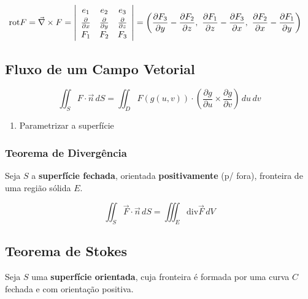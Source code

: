 \documentclass[11pt, a4paper]{article}
\begin{document}
\begin{align*}
    \text{rot} F = \vec{\nabla} \times F & =
    \left\vert
    \begin{array}{c c c}
        e_1                         & e_2 & e_3 \\[2pt]
        \frac{\partial}{\partial x} &
        \frac{\partial}{\partial y} &
        \frac{\partial}{\partial z}             \\[2pt]
        F_1                         & F_2 & F_3
    \end{array}
    \right\vert
    = \left(\frac{\partial F_3}{\partial y} - \frac{\partial F_2}{\partial z}
    ,\ \frac{\partial F_1}{\partial z} - \frac{\partial F_3}{\partial x}
    ,\ \frac{\partial F_2}{\partial x} - \frac{\partial F_1}{\partial y}
    \right)
\end{align*}

\subsection{Fluxo de um Campo Vetorial}

\begin{equation*}
    \iint_S F \cdot \vec{n} \, dS =
    \iint_D F(g(u, v)) \cdot
    \left(
    \frac{\partial g}{\partial u} \times \frac{\partial g}{\partial v}
    \right) \, du\,dv
\end{equation*}

\begin{enumerate}
    \item Parametrizar a superfície
\end{enumerate}

\subsubsection{Teorema de Divergência}

Seja $S$ a \textbf{superfície fechada}, orientada \textbf{positivamente} (p/
fora), fronteira de uma região sólida $E$.

\begin{equation*}
    \iint_S \vec{F} \cdot \vec{n} \, dS =
    \iiint_E \text{div} \vec{F} \, dV
\end{equation*}

\subsection{Teorema de Stokes}

Seja $S$ uma \textbf{superfície orientada}, cuja fronteira é formada por uma
curva $C$ fechada e com orientação positiva.
\end{document}
